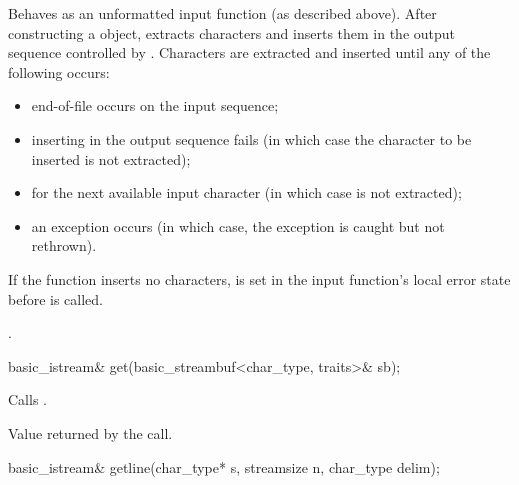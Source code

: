 \begin{itemdescr}
\pnum
\effects
Behaves as an unformatted input function
(as described above).
After constructing a  object, extracts
characters and inserts them
in the output sequence controlled by
.
Characters are extracted and inserted until any of the following occurs:
\begin{itemize}
\item
end-of-file occurs on the input sequence;
\item
inserting in the output sequence fails
(in which case the character to be inserted is not extracted);
\item
{} for the next available input
character 
(in which case  is not extracted);
\item
an exception occurs
(in which case, the exception is caught but not rethrown).
\end{itemize}

\pnum
If the function inserts no characters,
 is set in the input function's local error state
before  is called.

\pnum
\returns
{}.
\end{itemdescr}

%
\begin{itemdecl}
basic_istream& get(basic_streambuf<char_type, traits>& sb);
\end{itemdecl}

\begin{itemdescr}
\pnum
\effects
Calls
.

\pnum
\returns
Value returned by the call.
\end{itemdescr}

%
\begin{itemdecl}
basic_istream& getline(char_type* s, streamsize n, char_type delim);
\end{itemdecl}

